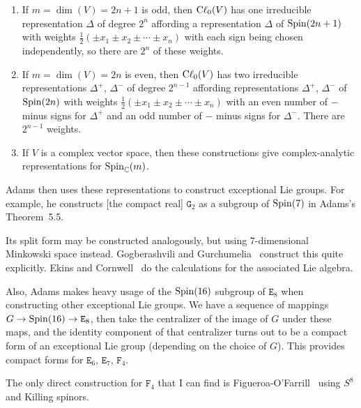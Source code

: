 \begin{proposition}
\begin{enumerate}
\item If $m=\dim(V)=2n+1$ is odd, then $\mathrm{C}\ell_{0}(V)$ has one irreducible
  representation $\Delta$ of degree $2^{n}$ affording a representation
  $\Delta$ of $\operatorname{Spin}(2n+1)$ with weights $\frac{1}{2}(\pm x_{1}\pm x_{2}\pm\cdots\pm x_{n})$
  with each sign being chosen independently, so there are $2^{n}$ of
  these weights.
\item If $m=\dim(V)=2n$ is even, then $\mathrm{C}\ell_{0}(V)$ has two irreducible
  representations $\Delta^{+}$, $\Delta^{-}$ of degree $2^{n-1}$
  affording representations $\Delta^{+}$, $\Delta^{-}$ of $\operatorname{Spin}(2n)$
  with weights $\frac{1}{2}(\pm x_{1}\pm x_{2}\pm\cdots\pm x_{n})$
  with an even number of $-$ minus signs for $\Delta^{+}$ and an odd number of
  $-$ minus signs for $\Delta^{-}$. There are $2^{n-1}$ weights.
\item If $V$ is a complex vector space, then these constructions give
  complex-analytic representations for $\operatorname{Spin}_{\mathbb{C}}(m)$.
\end{enumerate}
\end{proposition}

\M
Adams then uses these representations to construct exceptional Lie
groups. For example, he constructs [the compact real] $\mathtt{G}_{2}$
as a subgroup of $\operatorname{Spin}(7)$ in Adams's Theorem~5.5.

Its split form may be constructed analogously, but using 7-dimensional
Minkowski space instead.
Gogberashvili and Gurchumelia~\cite{Gogberashvili:2019ojg} construct
this quite explicitly. Ekins and Cornwell~\cite{Ekins:1975yu} do the
calculations for the associated Lie algebra.

\M
Also, Adams makes heavy usage of the $\operatorname{Spin}(16)$ subgroup of
$\mathtt{E}_{8}$ when constructing other exceptional Lie groups.
We have a sequence of mappings $G\to\operatorname{Spin}(16)\to\mathtt{E}_{8}$,
then take the centralizer of the image of $G$ under these maps, and the
identity component of that centralizer turns out to be a compact form of
an exceptional Lie group (depending on the choice of $G$).
This provides compact forms for $\mathtt{E}_{6}$, $\mathtt{E}_{7}$,
$\mathtt{F}_{4}$.

The only direct construction for $\mathtt{F}_{4}$
that I can find is Figueroa-O'Farrill~\cite{Figueroa-OFarrill:2007jcv}
using $S^{8}$ and Killing spinors.